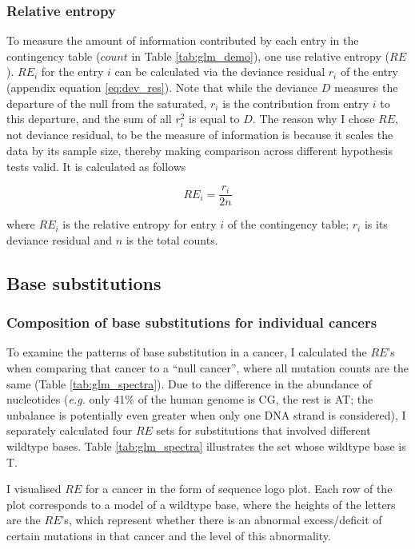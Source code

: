 \subsubsection{Relative entropy}\label{methods:re}
To measure the amount of information contributed by each entry in the contingency table ($count$ in Table \ref{tab:glm_demo}), one use relative entropy ($RE$). $RE_i$ for the entry $i$ can be calculated via the deviance residual $r_i$ of the entry (appendix equation \ref{eq:dev_res}). Note that while the deviance $D$ measures the departure of the null from the saturated, $r_i$ is the contribution from entry $i$ to this departure, and the sum of all $r_i^2$ is equal to $D$. The reason why I chose $RE$, not deviance residual, to be the measure of information is because it scales the data by its sample size, thereby making comparison across different hypothesis tests valid. It is calculated as follows

\begin{equation}
    RE_i = \frac{r_i}{2n} 
    \label{eq:re}
\end{equation}

where $RE_i$ is the relative entropy for entry $i$ of the contingency table; $r_i$ is its deviance residual and $n$ is the total counts. 

\subsection{Base substitutions}
\subsubsection{Composition of base substitutions for individual cancers}
To examine the patterns of base substitution in a cancer, I calculated the $RE$'s when comparing that cancer to a ``null cancer'', where all mutation counts are the same (Table \ref{tab:glm_spectra}). Due to the difference in the abundance of nucleotides (\textit{e.g.} only 41\% of the human genome is CG, the rest is AT; the unbalance is potentially even greater when only one DNA strand is considered), I separately calculated four $RE$ sets for substitutions that involved different wildtype bases. Table \ref{tab:glm_spectra} illustrates the set whose wildtype base is T. 



I visualised $RE$ for a cancer in the form of sequence logo plot. Each row of the plot corresponds to a model of a wildtype base, where the heights of the letters are the $RE$'s, which represent whether there is an abnormal excess/deficit of certain mutations in that cancer and the level of this abnormality.

